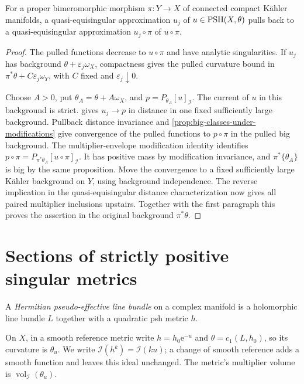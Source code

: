 \begin{corollary}\label{cor:quasi-equisingular-pullback}
For a proper bimeromorphic morphism $\pi:Y\to X$ of connected compact K\"ahler manifolds, a quasi-equisingular approximation $u_j$ of $u\in\mathrm{PSH}(X,\theta)$ pulls back to a quasi-equisingular approximation $u_j\circ\pi$ of $u\circ\pi$.
\end{corollary}
\begin{proof}
The pulled functions decrease to $u\circ\pi$ and have analytic singularities. If $u_j$ has background $\theta+\varepsilon_j\omega_X$, compactness gives the pulled curvature bound in
$\pi^*\theta+C\varepsilon_j\omega_Y$, with $C$ fixed and $\varepsilon_j\downarrow0$.

Choose $A>0$, put $\theta_A=\theta+A\omega_X$, and $p=P_{\theta_A}[u]_{\mathcal I}$. The current of $u$ in this background is strict.  gives $u_j\to p$ in distance in one fixed sufficiently large background. Pullback distance invariance and \cref{prop:big-classes-under-modifications} give convergence of the pulled functions to $p\circ\pi$ in the pulled big background. The multiplier-envelope modification identity identifies
$p\circ\pi=P_{\pi^*\theta_A}[u\circ\pi]_{\mathcal I}$.
It has positive mass by modification invariance, and $\pi^*\{\theta_A\}$ is big by the same proposition. Move the convergence to a fixed sufficiently large K\"ahler background on $Y$, using background independence. The reverse implication in the quasi-equisingular distance characterization now gives all paired multiplier inclusions upstairs. Together with the first paragraph this proves the assertion in the original background $\pi^*\theta$.
\end{proof}

\section{Sections of strictly positive singular metrics}
\label{sec:strict-singular-section-asymptotics}
\begin{definition}\label{def:hermitian-pseudo-effective-line-bundle}
A \emph{Hermitian pseudo-effective line bundle} on a complex manifold is a holomorphic line bundle $L$ together with a quadratic psh metric $h$.
\end{definition}
On $X$, in a smooth reference metric write $h=h_0\mathrm e^{-u}$ and $\theta=c_1(L,h_0)$, so its curvature is $\theta_u$. We write $\mathcal I(h^k)=\mathcal I(ku)$; a change of smooth reference adds a smooth function and leaves this ideal unchanged. The metric's multiplier volume is $\operatorname{vol}_{\mathcal I}(\theta_u)$.

